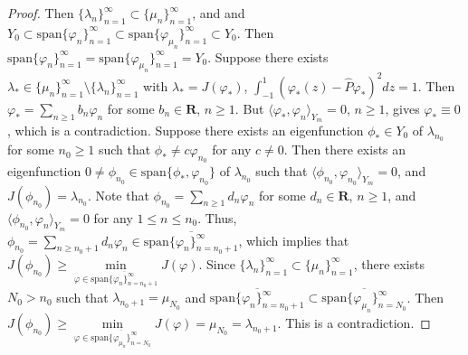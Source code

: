 \documentclass[1 [leqno, 11pt]{amsart}
\numberwithin{equation}{section}
\begin{document}
\begin{CJK*}{GBK}{song}
\begin{proof}
Then $\{\lambda_n\}_{n=1}^\infty\subset\{\mu_n\}_{n=1}^\infty$, and
and $Y_0\subset\text{span}\{\varphi_n\}_{n=1}^\infty\subset\text{span}\{\varphi_{\mu_n}\}_{n=1}^\infty\subset Y_0$.
Then $\text{span}\{\varphi_n\}_{n=1}^\infty=\text{span}\{\varphi_{\mu_n}\}_{n=1}^\infty=Y_0$.
Suppose there exists $\lambda_*\in\{\mu_n\}_{n=1}^\infty\setminus\{\lambda_n\}_{n=1}^\infty$ with $\lambda_*=J(\varphi_*)$, $\int_{-1}^1(\varphi_{*}(z)-\hat P\varphi_{*})^2dz=1$. Then
$\varphi_*=\sum_{n\geq1}b_{n}\varphi_n$ for some  $b_n\in\mathbf{R}$, $n\geq1$. But $\langle\varphi_*,\varphi_n\rangle_{Y_m}=0$, $n\geq1$, gives $\varphi_*\equiv0$, which is a contradiction. Suppose there exists an eigenfunction $\phi_*\in Y_0$ of  $\lambda_{n_0}$ for some $n_0\geq1$ such that $\phi_*\neq c\varphi_{n_0}$ for any $c\neq0$. Then  there exists an eigenfunction $0\neq\phi_{n_0}\in\text{span}\{\phi_*,\varphi_{n_0}\}$ of $\lambda_{n_0}$ such that $\langle\phi_{n_0},\varphi_{n_0}\rangle_{Y_m}=0$, and $J(\phi_{n_0})=\lambda_{n_0}$. Note that  $\phi_{n_0}=\sum_{n\geq1}d_{n}\varphi_n$ for some  $d_n\in\mathbf{R}$, $n\geq1$, and
 $\langle\phi_{n_0},\varphi_{n}\rangle_{Y_m}=0$ for any $1\leq n\leq n_0$.
 Thus,  $\phi_{n_0}=\sum_{n\geq n_0+1}d_{n}\varphi_n\in\overline{\text{span}\{\varphi_n\}_{n=n_0+1}^\infty}$, which implies that
 $J(\phi_{n_0})\geq\min\limits_{\varphi\in \overline{\text{span}\{\varphi_n\}_{n=n_0+1}^\infty}}J(\varphi)$.
 Since $\{\lambda_n\}_{n=1}^\infty\subset\{\mu_n\}_{n=1}^\infty$, there exists $N_0>n_0$ such that $\lambda_{n_0+1}=\mu_{N_0}$ and $\overline{\text{span}\{\varphi_n\}_{n=n_0+1}^\infty}\subset\overline{\text{span}\{\varphi_{\mu_n}\}_{n=N_0}^\infty}$. Then $J(\phi_{n_0})\geq\min\limits_{\varphi\in \overline{\text{span}\{\varphi_{\mu_n}\}_{n=N_0}^\infty}}J(\varphi)=\mu_{N_0}=\lambda_{n_0+1}$.  This is a contradiction.
 \fi
\end{proof}


\medskip


\end{CJK*}
\end{document}
